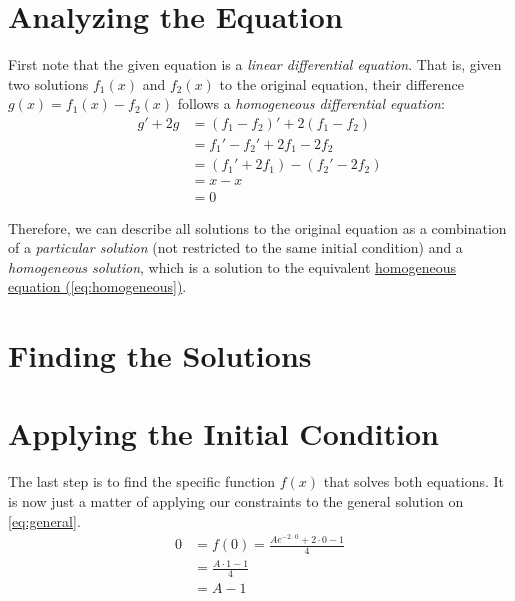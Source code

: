 \section*{Analyzing the Equation}

    First note that the given equation is a \textit{linear differential equation}. That is, given two solutions $f_1(x)$ and $f_2(x)$ to the original equation, their difference $g(x) = f_1(x) - f_2(x)$ follows a \textit{homogeneous differential equation}:
    \begin{align}
        g' + 2g &= \left(f_1 - f_2\right)' + 2\left(f_1 - f_2\right) \nonumber\\
            &= f_1' - f_2' + 2f_1 - 2f_2 \nonumber\\
            &= \left(f_1' + 2f_1\right) - \left(f_2' - 2f_2\right) \nonumber\\
            &= x - x \nonumber\\
            &= 0 \label{eq:homogeneous}
    \end{align}

    Therefore, we can describe all solutions to the original equation as a combination of a \textit{particular solution} (not restricted to the same initial condition) and a \textit{homogeneous solution}, which is a solution to the equivalent \hyperref[eq:homogeneous]{homogeneous equation (\ref*{eq:homogeneous})}.

\section*{Finding the Solutions}

    
    
    

\newpage

\section*{Applying the Initial Condition}

    The last step is to find the specific function $f(x)$ that solves both equations. It is now just a matter of applying our constraints to the general solution on \cref{eq:general}.
    \begin{align*}
        0 &= f(0) = \frac{A e^{-2 \cdot 0} + 2 \cdot 0 - 1}{4} \\
        &= \frac{A \cdot 1 - 1}{4} \\
        &= A - 1
    \end{align*}

